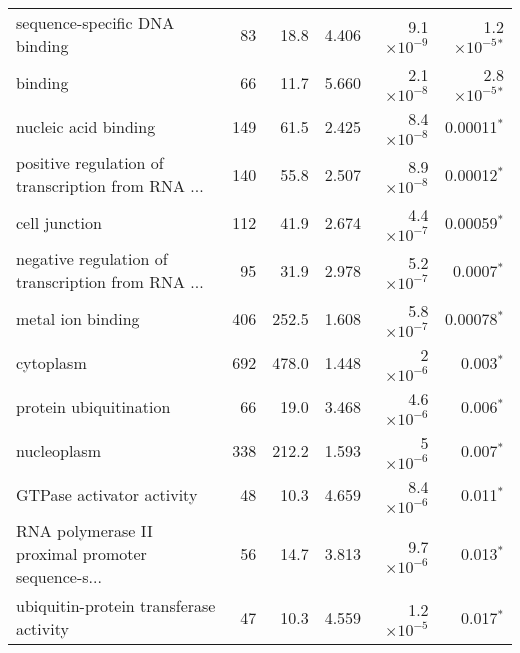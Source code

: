 \begin{longtable}{|l|r|r|r|r|r|}
                     sequence-specific DNA binding &                      83 &                    18.8 &      4.406 &  9.1$\times 10^{-9}$ &   1.2$\times 10^{-5}$$\bm{^*}$ \\
                                           binding &                      66 &                    11.7 &      5.660 &  2.1$\times 10^{-8}$ &   2.8$\times 10^{-5}$$\bm{^*}$ \\
                              nucleic acid binding &                     149 &                    61.5 &      2.425 &  8.4$\times 10^{-8}$ &               0.00011$\bm{^*}$ \\
 positive regulation of transcription from RNA ... &                     140 &                    55.8 &      2.507 &  8.9$\times 10^{-8}$ &               0.00012$\bm{^*}$ \\
                                     cell junction &                     112 &                    41.9 &      2.674 &  4.4$\times 10^{-7}$ &               0.00059$\bm{^*}$ \\
 negative regulation of transcription from RNA ... &                      95 &                    31.9 &      2.978 &  5.2$\times 10^{-7}$ &                0.0007$\bm{^*}$ \\
                                 metal ion binding &                     406 &                   252.5 &      1.608 &  5.8$\times 10^{-7}$ &               0.00078$\bm{^*}$ \\
                                         cytoplasm &                     692 &                   478.0 &      1.448 &    2$\times 10^{-6}$ &                 0.003$\bm{^*}$ \\
                            protein ubiquitination &                      66 &                    19.0 &      3.468 &  4.6$\times 10^{-6}$ &                 0.006$\bm{^*}$ \\
                                       nucleoplasm &                     338 &                   212.2 &      1.593 &    5$\times 10^{-6}$ &                 0.007$\bm{^*}$ \\
                         GTPase activator activity &                      48 &                    10.3 &      4.659 &  8.4$\times 10^{-6}$ &                 0.011$\bm{^*}$ \\
 RNA polymerase II proximal promoter sequence-s... &                      56 &                    14.7 &      3.813 &  9.7$\times 10^{-6}$ &                 0.013$\bm{^*}$ \\
            ubiquitin-protein transferase activity &                      47 &                    10.3 &      4.559 &  1.2$\times 10^{-5}$ &                 0.017$\bm{^*}$ \\

\end{longtable}
